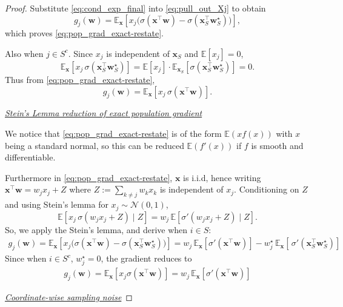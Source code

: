 \documentclass[10pt,a4paper]{amsart}
\begin{document}
\begin{proof}
Substitute \eqref{eq:cond_exp_final} into \eqref{eq:pull_out_Xj} to obtain
\[
\label{exact_pop_grad}
g_j(\boldsymbol w)
=
\mathbb E_{\boldsymbol x}\!\left[
x_j\Big(\sigma(\boldsymbol x^\top \boldsymbol w)-\sigma(\boldsymbol x_S^\top \boldsymbol w_S^\star)\Big)
\right],
\]
which proves \eqref{eq:pop_grad_exact-restate}.

Also when $j\in S^c$.
Since $x_j$ is independent of $\boldsymbol x_S$ and $\mathbb E[x_j] = 0$,
\[
\mathbb E_{\boldsymbol x}\!\left[x_j\,\sigma(\boldsymbol x_S^\top \boldsymbol w_S^\star)\right]
=
\mathbb E[x_j]\cdot \mathbb E_{\boldsymbol x_S}\!\left[\sigma(\boldsymbol x_S^\top \boldsymbol w_S^\star)\right]
=0.
\]
Thus from \eqref{eq:pop_grad_exact-restate},
\[
g_j(\boldsymbol w)=\mathbb E_{\boldsymbol x}\!\left[x_j\,\sigma(\boldsymbol x^\top \boldsymbol w)\right].
\]

\underline{\textit{Stein's Lemma reduction of exact population gradient}}

We notice that \eqref{eq:pop_grad_exact-restate} is of the form $\mathbb{E}(xf(x))$ with $x$ being a standard normal, so this can be reduced $\mathbb{E}(f'(x))$ if $f$ is smooth and differentiable. 

Furthermore in \eqref{eq:pop_grad_exact-restate}, $\mathbf{x}$ is i.i.d, hence writing $\boldsymbol x^\top \boldsymbol w = w_j x_j + Z$ where
$Z:=\sum_{k\neq j} w_k x_k$ is independent of $x_j$.
Conditioning on $Z$ and using Stein's lemma for $x_j\sim\mathcal N(0,1)$,
\[
\mathbb E\!\left[x_j\,\sigma(w_j x_j+Z)\mid Z\right]
=
w_j\,\mathbb E\!\left[\sigma'(w_j x_j+Z)\mid Z\right].
\]
So, we apply the Stein's lemma, and derive when $i\in S$:
\begin{align}
  g_j(\boldsymbol w)=  \mathbb E_{\boldsymbol x}\!\left[
x_j\Big(\sigma(\boldsymbol x^\top \boldsymbol w)-\sigma(\boldsymbol x_S^\top \boldsymbol w_S^\star)\Big)\right] = w_j\,\mathbb E_{\boldsymbol x}\!\left[\sigma'(\boldsymbol x^\top \boldsymbol w)\right] - w^{\star}_j\,\mathbb E_{\boldsymbol x}\!\left[\,\sigma'(\boldsymbol x_S^\top \boldsymbol w_S^\star)\right]
\end{align}
Since when $i \in S^{c}$, $w^{\star}_j = 0$, the gradient reduces to 
\begin{align}
  g_j(\boldsymbol w) =   \mathbb E_{\boldsymbol x}\!\left[
x_j\sigma(\boldsymbol x^\top \boldsymbol w)\right] = w_j\,\mathbb E_{\boldsymbol x}\!\left[\sigma'(\boldsymbol x^\top \boldsymbol w)\right] 
\end{align}

\underline{\textit{Coordinate-wise sampling noise}}






\end{proof}
\end{document}
